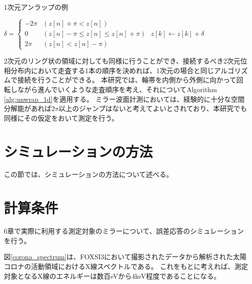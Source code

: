 \begin{algorithm}                      
\caption{1次元アンラップの例}         
\label{alg:unwrap_1d}                          
\begin{algorithmic}
        \STATE $\delta = \begin{cases}
                -2 \pi & (z[n] + \pi < z[n]) \\
                0 & (z[n] - \pi \leq z[n] \leq z[n] + \pi) \\
                2 \pi & (z[n] < z[n] - \pi)
            \end{cases}$
            \STATE $z[k] \leftarrow z[k] + \delta$
        \ENDFOR
    \ENDFOR
\end{algorithmic}
\end{algorithm}

2次元のリング状の領域に対しても同様に行うことができ、接続するべき2次元位相分布内において走査する1本の順序を決めれば、1次元の場合と同じアルゴリズムで接続を行うことができる。
本研究では、輪帯を内側から外側に向かって回転しながら進んでいくような走査順序を考え、それについてAlgorithm \ref{alg:unwrap_1d}を適用する。
ミラー波面計測においては、経験的に十分な空間分解能があれば$2\pi$以上のジャンプはないと考えてよいとされており、本研究でも同様にその仮定をおいて測定を行う。

\clearpage
\newpage



\section{シミュレーションの方法}
この節では、シミュレーションの方法について述べる。


\clearpage
\newpage

\section{計算条件}
6章で実際に利用する測定対象のミラーについて、誤差応答のシミュレーションを行う。

図\ref{corona_spectrum}は、FOXSI3において撮影されたデータから解析された太陽コロナの活動領域におけるX線スペクトルである。\cite{2019AGUFMSH31C3315V}
これをもとに考えれば、測定対象となるX線のエネルギーは数百eVから4keV程度であることになる。

